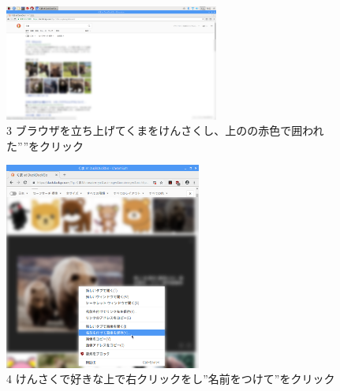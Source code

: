 \documentclass[a4paper,12pt]{jarticle}
\begin{document}
\begin{figure}[t]
  \begin{minipage}{\textwidth}
    \begin{minipage}{7.033cm}
      \includegraphics[width=7.049cm]{textbook-img096.png}\\
      3 ブラウザを立ち上げてくまをけんさくし、上のの赤色で囲われた””をクリック
    \end{minipage}
    \begin{minipage}{3.582cm}
    \end{minipage}
    \begin{minipage}{6.582cm}
      \includegraphics[width=6.468cm]{textbook-img095.png}\\
      4 けんさくで好きな上で右クリックをし”名前をつけて”をクリック
    \end{minipage}
  \end{minipage}


\end{figure}
\end{document}
